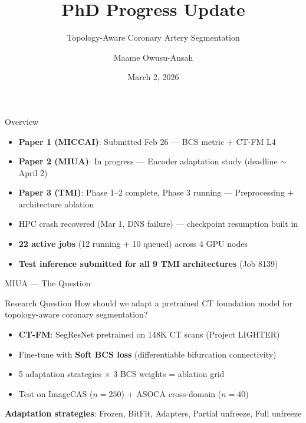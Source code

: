 \documentclass[aspectratio=169,10pt]{beamer}
\title{PhD Progress Update}
\subtitle{Topology-Aware Coronary Artery Segmentation}
\author{Maame Owusu-Ansah}
\date{March 2, 2026}
\begin{document}
\begin{frame}
\titlepage
\end{frame}

\begin{frame}{Overview}

\begin{itemize}
    \item \textbf{Paper 1 (MICCAI)}: Submitted Feb 26 --- BCS metric + CT-FM L4
    \item \textbf{Paper 2 (MIUA)}: In progress --- Encoder adaptation study (deadline $\sim$April 2)
    \item \textbf{Paper 3 (TMI)}: Phase 1--2 complete, Phase 3 running --- Preprocessing + architecture ablation
    \item HPC crash recovered (Mar 1, DNS failure) --- checkpoint resumption built in
    \item \textbf{22 active jobs} (12 running + 10 queued) across 4 GPU nodes
    \item \textbf{Test inference submitted for all 9 TMI architectures} (Job 8139)
\end{itemize}

\end{frame}

\begin{frame}{MIUA --- The Question}

\begin{block}{Research Question}
How should we adapt a pretrained CT foundation model for topology-aware coronary segmentation?
\end{block}

\begin{itemize}
    \item \textbf{CT-FM}: SegResNet pretrained on 148K CT scans (Project LIGHTER)
    \item Fine-tune with \textbf{Soft BCS loss} (differentiable bifurcation connectivity)
    \item 5 adaptation strategies $\times$ 3 BCS weights = ablation grid
    \item Test on ImageCAS ($n=250$) + ASOCA cross-domain ($n=40$)
\end{itemize}

\vspace{0.3cm}
\textbf{Adaptation strategies}: Frozen, BitFit, Adapters, Partial unfreeze, Full unfreeze

\end{frame}
\end{document}
